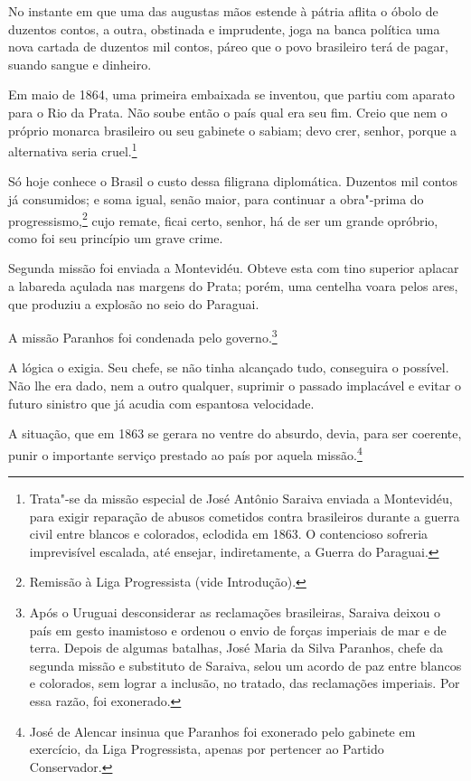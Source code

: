 \begin{linenumbers}
 No instante em que uma das augustas mãos estende à pátria aflita o
óbolo de duzentos contos, a outra, obstinada e imprudente, joga na
banca política uma nova cartada de duzentos mil contos, páreo que o
povo brasileiro terá de pagar, suando sangue e dinheiro. 

 Em maio de 1864, uma primeira embaixada se inventou, que partiu com
aparato para o Rio da Prata. Não soube então o país qual era seu fim.
Creio que nem o próprio monarca brasileiro ou seu gabinete o sabiam;
devo crer, senhor, porque a alternativa seria
cruel.\footnote{ Trata"-se da missão especial de José Antônio Saraiva enviada a Montevidéu, 
para exigir reparação de abusos cometidos contra brasileiros durante a guerra civil 
entre blancos e colorados, eclodida em 1863. O contencioso sofreria imprevisível 
escalada, até ensejar, indiretamente, a Guerra do Paraguai.}

 Só hoje conhece o Brasil o custo dessa filigrana diplomática. Duzentos
mil contos já consumidos; e soma igual, senão maior, para continuar a
obra"-prima do progressismo,\footnote{ Remissão à Liga Progressista (vide Introdução).}
 cujo remate, ficai certo, senhor, há de ser um grande opróbrio, como
foi seu princípio um grave crime.

 Segunda missão foi enviada a Montevidéu. Obteve esta com tino superior
aplacar a labareda açulada nas margens do Prata; porém, uma centelha
voara pelos ares, que produziu a explosão no seio do Paraguai. 

 A missão Paranhos foi condenada pelo
governo.\footnote{ Após o Uruguai desconsiderar as reclamações brasileiras, Saraiva 
deixou o país em gesto inamistoso e ordenou o envio de forças imperiais de mar e de terra. 
Depois de algumas batalhas, José Maria da Silva Paranhos, chefe da segunda missão e substituto 
de Saraiva, selou um acordo de paz entre blancos e colorados, sem lograr a inclusão, no tratado, 
das reclamações imperiais. Por essa razão, foi exonerado.}

 A lógica o exigia. Seu chefe, se não tinha alcançado tudo, conseguira o
possível. Não lhe era dado, nem a outro qualquer, suprimir o passado
implacável e evitar o futuro sinistro que já acudia com espantosa velocidade.

 A situação, que em 1863 se gerara no ventre do absurdo, devia, para ser
coerente, punir o importante serviço prestado ao país por aquela
missão.\footnote{ José de Alencar insinua que Paranhos foi exonerado pelo gabinete em exercício,
da Liga Progressista, apenas por pertencer ao Partido Conservador.}
 

\end{linenumbers}
